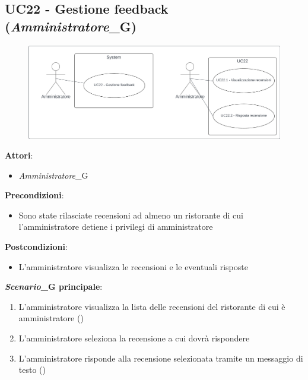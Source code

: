 \subsection{UC22 - Gestione feedback (\textit{Amministratore}_G)}\label{usecase2:22}
\begin{figure}[H]
    \centering
    \includegraphics[width=0.9\linewidth]{ucd/ucd22.png}
\end{figure}
\textbf{Attori}:
\begin{itemize}
    \item \textit{Amministratore}_G
\end{itemize}
\textbf{Precondizioni}:
\begin{itemize}
    \item Sono state rilasciate recensioni ad almeno un ristorante di cui l'amministratore detiene i privilegi di amministratore
\end{itemize}
\textbf{Postcondizioni}:
\begin{itemize}
    \item L'amministratore visualizza le recensioni e le eventuali risposte
\end{itemize}
\textbf{\textit{Scenario}_G principale}:
\begin{enumerate}
    \item L'amministratore visualizza la lista delle recensioni del ristorante di cui è amministratore ()
    \item L'amministratore seleziona la recensione a cui dovrà rispondere
    \item L'amministratore risponde alla recensione selezionata tramite un messaggio di testo ()
\end{enumerate}
